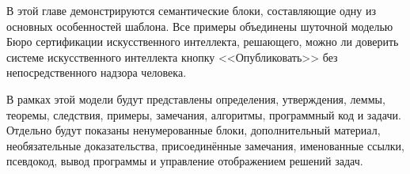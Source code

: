 В этой главе демонстрируются семантические блоки, составляющие одну из основных особенностей шаблона.
Все примеры объединены шуточной моделью Бюро сертификации искусственного интеллекта, решающего, можно ли доверить системе искусственного интеллекта кнопку <<Опубликовать>> без непосредственного надзора человека.

В рамках этой модели будут представлены определения, утверждения, леммы, теоремы, следствия, примеры, замечания, алгоритмы, программный код и задачи.
Отдельно будут показаны ненумерованные блоки, дополнительный материал, необязательные доказательства, присоединённые замечания, именованные ссылки, псевдокод, вывод программы и управление отображением решений задач.